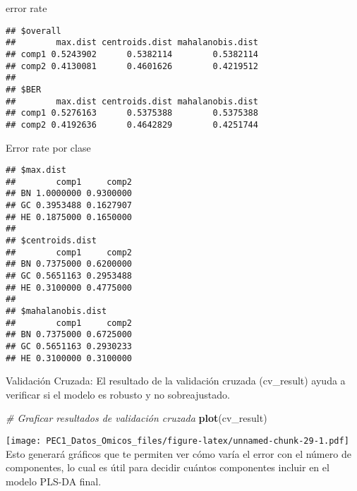 \documentclass[
]{article}
\newenvironment{Shaded}{\begin{snugshade}}{\end{snugshade}}
\newcommand{\CommentTok}[1]{\textcolor[rgb]{0.56,0.35,0.01}{\textit{#1}}}
\newcommand{\FunctionTok}[1]{\textcolor[rgb]{0.13,0.29,0.53}{\textbf{#1}}}
\newcommand{\NormalTok}[1]{#1}
\newcommand{\SpecialCharTok}[1]{\textcolor[rgb]{0.81,0.36,0.00}{\textbf{#1}}}
\begin{document}
error rate

\begin{Shaded}
\end{Shaded}

\begin{verbatim}
## $overall
##        max.dist centroids.dist mahalanobis.dist
## comp1 0.5243902      0.5382114        0.5382114
## comp2 0.4130081      0.4601626        0.4219512
## 
## $BER
##        max.dist centroids.dist mahalanobis.dist
## comp1 0.5276163      0.5375388        0.5375388
## comp2 0.4192636      0.4642829        0.4251744
\end{verbatim}

Error rate por clase

\begin{Shaded}
\end{Shaded}

\begin{verbatim}
## $max.dist
##        comp1     comp2
## BN 1.0000000 0.9300000
## GC 0.3953488 0.1627907
## HE 0.1875000 0.1650000
## 
## $centroids.dist
##        comp1     comp2
## BN 0.7375000 0.6200000
## GC 0.5651163 0.2953488
## HE 0.3100000 0.4775000
## 
## $mahalanobis.dist
##        comp1     comp2
## BN 0.7375000 0.6725000
## GC 0.5651163 0.2930233
## HE 0.3100000 0.3100000
\end{verbatim}

Validación Cruzada: El resultado de la validación cruzada (cv\_result)
ayuda a verificar si el modelo es robusto y no sobreajustado.

\begin{Shaded}
\begin{Highlighting}[]
\CommentTok{\# Graficar resultados de validación cruzada}
\FunctionTok{plot}\NormalTok{(cv\_result)}
\end{Highlighting}
\end{Shaded}

\texttt{[image: PEC1\_Datos\_Omicos\_files/figure-latex/unnamed-chunk-29-1.pdf]}
Esto generará gráficos que te permiten ver cómo varía el error con el
número de componentes, lo cual es útil para decidir cuántos componentes
incluir en el modelo PLS-DA final.
\end{document}

